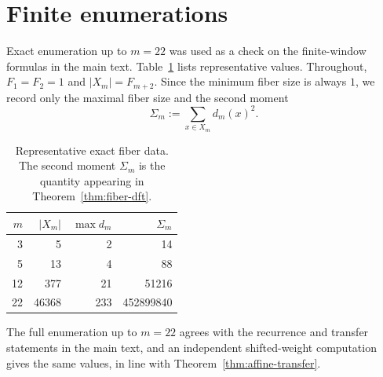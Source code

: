 \section{Finite enumerations}\label{app:sanity}

Exact enumeration up to $m=22$ was used as a check on the finite-window formulas in the main text.  Table~\ref{tab:sanity-fibers} lists representative values.  Throughout, $F_1=F_2=1$ and $|X_m|=F_{m+2}$.  Since the minimum fiber size is always $1$, we record only the maximal fiber size and the second moment
\[
\Sigma_m:=\sum_{x\in X_m} d_m(x)^2.
\]

\begin{table}[t]
\centering
\caption{Representative exact fiber data. The second moment $\Sigma_m$ is the quantity appearing in Theorem~\ref{thm:fiber-dft}.}
\label{tab:sanity-fibers}
\renewcommand{\arraystretch}{1.15}
\begin{tabular}{rrrr}
\toprule
$m$ & $|X_m|$ & $\max d_m$ & $\Sigma_m$ \\
\midrule
3 & 5 & 2 & 14 \\
5 & 13 & 4 & 88 \\
12 & 377 & 21 & 51216 \\
22 & 46368 & 233 & 452899840 \\
\bottomrule
\end{tabular}
\end{table}

The full enumeration up to $m=22$ agrees with the recurrence and transfer statements in the main text, and an independent shifted-weight computation gives the same values, in line with Theorem~\ref{thm:affine-transfer}.
